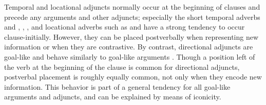 Temporal and locational adjuncts normally occur at the beginning of clauses and precede any arguments and other adjuncts; especially the short temporal adverbs  and   , , , and locational adverbs such as  and  have a strong tendency to occur clause-initially. However, they can be placed postverbally when representing new information or when they are contrastive. By contrast, directional adjuncts are goal-like and behave similarly to goal-like arguments . Though a position left of the verb at the beginning of the clause is common for directional adjuncts, postverbal placement is roughly equally common, not only when they encode new information. This behavior is part of a general tendency for all goal-like arguments and adjuncts, and can be explained by means of iconicity.

